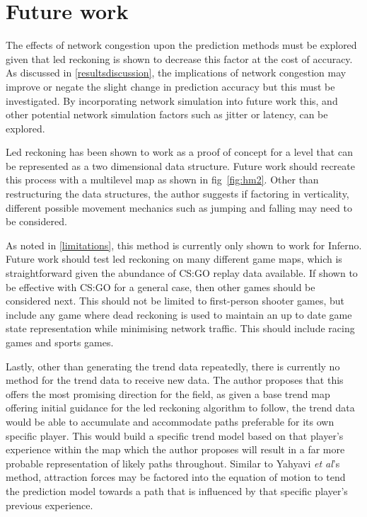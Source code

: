 \documentclass[journal]{IEEEtran}
\begin{document}
\section{Future work} \label{futurework}

The effects of network congestion upon the prediction methods must be explored given that led reckoning is shown to decrease this factor at the cost of accuracy. As discussed in \ref{resultsdiscussion}, the implications of network congestion may improve or negate the slight change in prediction accuracy but this must be investigated. By incorporating network simulation into future work this, and other potential network simulation factors such as jitter or latency, can be explored.

Led reckoning has been shown to work as a proof of concept for a level that can be represented as a two dimensional data structure. Future work should recreate this process with a multilevel map as shown in fig~\ref{fig:hm2}. Other than restructuring the data structures, the author suggests if factoring in verticality, different possible movement mechanics such as jumping and falling may need to be considered.

As noted in \ref{limitations}, this method is currently only shown to work for Inferno. Future work should test led reckoning on many different game maps, which is straightforward given the abundance of CS:GO replay data available. If shown to be effective with CS:GO for a general case, then other games should be considered next. This should not be limited to first-person shooter games, but include any game where dead reckoning is used to maintain an up to date game state representation while minimising network traffic. This should include racing games and sports games.

Lastly, other than generating the trend data repeatedly, there is currently no method for the trend data to receive new data. The author proposes that this offers the most promising direction for the field, as given a base trend map offering initial guidance for the led reckoning algorithm to follow, the trend data would be able to accumulate and accommodate paths preferable for its own specific player. This would build a specific trend model based on that player's experience within the map which the author proposes will result in a far more probable representation of likely paths throughout. Similar to Yahyavi \textit{et al}'s method, attraction forces may be factored into the equation of motion to tend the prediction model towards a path that is influenced by that specific player's previous experience.
\end{document}
